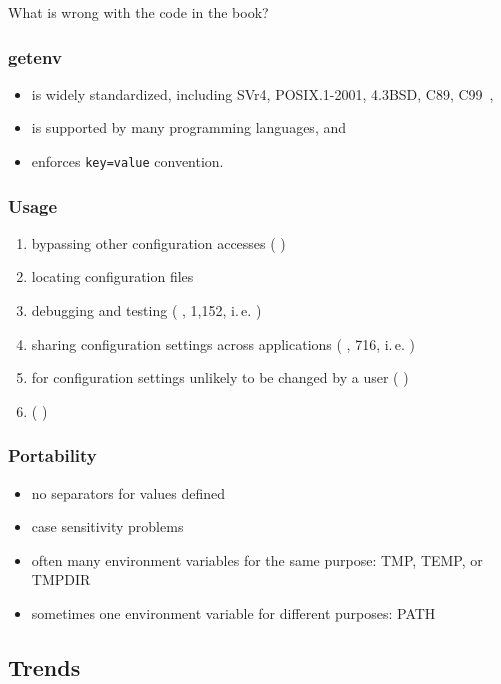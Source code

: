 \documentclass{beamer}
\begin{document}
\begin{assignment}
	\begin{task}
	What is wrong with the code in the book?
	\end{task}
\end{assignment}

\begin{frame}
	\frametitle{getenv}
	\begin{itemize}
	\item is widely standardized, including SVr4, POSIX.1-2001, 4.3BSD, C89, C99~\cite{man2017getenv},
	\item is supported by many programming languages, and
	\item enforces \texttt{key=value} convention.
	\end{itemize}
\end{frame}

\begin{frame}
	\frametitle{Usage}
	\begin{enumerate}
	\item bypassing other configuration accesses (\methodQuestion{} )
	\item locating configuration files
	\item debugging and testing (\methodQuestion{} , \methodSource{} 1,152, i.\,e. )
	\item sharing configuration settings across applications (\methodQuestion{} , \methodSource{} 716, i.\,e. )
	\item for configuration settings unlikely to be changed by a user (\methodQuestion{} )
	\item {} (\methodQuestion{} )
	\end{enumerate}
\end{frame}

\begin{frame}
	\frametitle{Portability}
	\begin{itemize}
	\item no separators for values defined
	\item case sensitivity problems
	\item often many environment variables for the same purpose: TMP, TEMP, or TMPDIR
	\item sometimes one environment variable for different purposes: PATH
	\end{itemize}
\end{frame}

\subsection{Trends}
\end{document}
